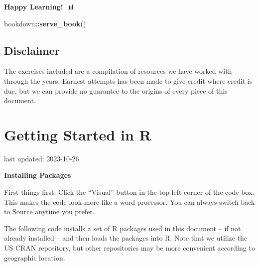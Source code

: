 \documentclass[
]{book}
\newenvironment{Shaded}{\begin{snugshade}}{\end{snugshade}}
\newcommand{\FunctionTok}[1]{\textcolor[rgb]{0.13,0.29,0.53}{\textbf{#1}}}
\newcommand{\NormalTok}[1]{#1}
\newcommand{\SpecialCharTok}[1]{\textcolor[rgb]{0.81,0.36,0.00}{\textbf{#1}}}
\begin{document}
\textbf{Happy Learning!} 🧬📊

\begin{Shaded}
\begin{Highlighting}[]
\NormalTok{bookdown}\SpecialCharTok{::}\FunctionTok{serve\_book}\NormalTok{()}
\end{Highlighting}
\end{Shaded}

\hypertarget{disclaimer}{%
\section{Disclaimer}\label{disclaimer}}

The exercises included are a compilation of resources we have worked with through the years. Earnest attempts has been made to give credit where credit is due, but we can provide no guarantee to the origins of every piece of this document.

\hypertarget{getting-started-in-r}{%
\chapter{Getting Started in R}\label{getting-started-in-r}}

last updated: 2023-10-26

\textbf{Installing Packages}

First things first: Click the ``Visual'' button in the top-left corner of the code box. This makes the code look more like a word processor. You can always switch back to Source anytime you prefer.

The following code installs a set of R packages used in this document -- if not already installed -- and then loads the packages into R. Note that we utilize the US CRAN repository, but other repositories may be more convenient according to geographic location.
\end{document}
